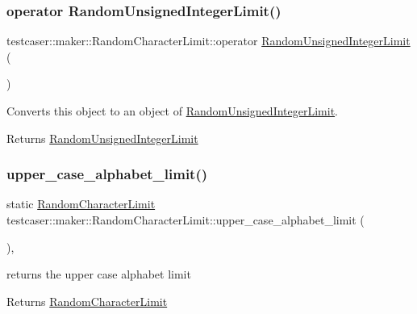 \subsubsection{\texorpdfstring{operator RandomUnsignedIntegerLimit()}{operator RandomUnsignedIntegerLimit()}}
{\footnotesize\ttfamily testcaser\+::maker\+::\+Random\+Character\+Limit\+::operator \mbox{\hyperlink{classtestcaser_1_1maker_1_1RandomUnsignedIntegerLimit}{Random\+Unsigned\+Integer\+Limit}} (\begin{DoxyParamCaption}{ }\end{DoxyParamCaption})\hspace{0.3cm}{\ttfamily [inline]}}



Converts this object to an object of \mbox{\hyperlink{classtestcaser_1_1maker_1_1RandomUnsignedIntegerLimit}{Random\+Unsigned\+Integer\+Limit}}. 

\begin{DoxyReturn}{Returns}
\mbox{\hyperlink{classtestcaser_1_1maker_1_1RandomUnsignedIntegerLimit}{Random\+Unsigned\+Integer\+Limit}} 
\end{DoxyReturn}
\mbox{\label{classtestcaser_1_1maker_1_1RandomCharacterLimit_a7a0ee0690e97a27402faca09c6044aed}} 
\subsubsection{\texorpdfstring{upper\_case\_alphabet\_limit()}{upper\_case\_alphabet\_limit()}}
{\footnotesize\ttfamily static \mbox{\hyperlink{classtestcaser_1_1maker_1_1RandomCharacterLimit}{Random\+Character\+Limit}} testcaser\+::maker\+::\+Random\+Character\+Limit\+::upper\+\_\+case\+\_\+alphabet\+\_\+limit (\begin{DoxyParamCaption}{ }\end{DoxyParamCaption})\hspace{0.3cm}{\ttfamily [inline]}, {\ttfamily [static]}}



returns the upper case alphabet limit 

\begin{DoxyReturn}{Returns}
\mbox{\hyperlink{classtestcaser_1_1maker_1_1RandomCharacterLimit}{Random\+Character\+Limit}} 
\end{DoxyReturn}
\mbox{\label{classtestcaser_1_1maker_1_1RandomCharacterLimit_a1b3f0a14a18aa307cf4a82f834393928}} 
